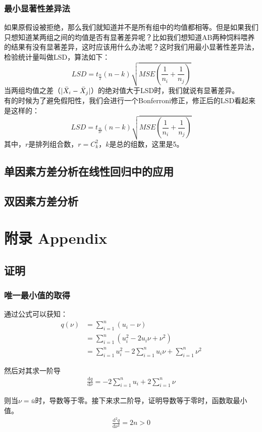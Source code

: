 \documentclass[UTF8]{ctexart}
\begin{document}
\subsubsection{最小显著性差异法}
如果原假设被拒绝，那么我们就知道并不是所有组中的均值都相等。但是如果我们只想知道某两组之间的均值是否有显著差异呢？比如我们想知道AB两种饲料喂养的结果有没有显著差异，这时应该用什么办法呢？这时我们用最小显著性差异法，检验统计量叫做LSD，算法如下：
\[
LSD=t_{\frac{\alpha}{2}}(n-k)\sqrt{MSE\left(\frac{1}{n_i}+\frac{1}{n_j}\right)}
\]
当两组均值之差（$|\Bar{X}_i-\Bar{X}_j|$）的绝对值大于LSD时，我们就说有显著差异。\\
有的时候为了避免假阳性，我们会进行一个Bonferroni修正，修正后的LSD看起来是这样的：
\[
LSD=t_{\frac{\alpha}{2r}}(n-k)\sqrt{MSE\left(\frac{1}{n_i}+\frac{1}{n_j}\right)}
\]
其中，$r$是排列组合数，$r=C_k^2$，$k$是总的组数，这里是5。
\subsection{单因素方差分析在线性回归中的应用}

\subsection{双因素方差分析}



\section{附录 Appendix}
\subsection{证明}
\subsubsection{唯一最小值的取得}
\label{proof13}
通过公式可以获知：
\begin{align*}
	q(\nu)&=\sum_{i=1}^n(u_i-\nu)\\
	&=\sum_{i=1}^n(u_i^2-2u_i\nu+\nu^2)\\
	&=\sum_{i=1}^nu_i^2-2\sum_{i=1}^nu_i\nu+\sum_{i=1}^n\nu^2
\end{align*}

然后对其求一阶导
\begin{align*}
	\frac{\mathrm dq}{\mathrm d\nu}=-2\sum_{i=1}^nu_i+2\sum_{i=1}^n\nu
\end{align*}

则当$\nu=\bar u$时，导数等于零。接下来求二阶导，证明导数等于零时，函数取最小值。
\begin{align*}
	\frac{\mathrm d^2q}{\mathrm d\nu^2}=2n>0
\end{align*}
\end{document}
